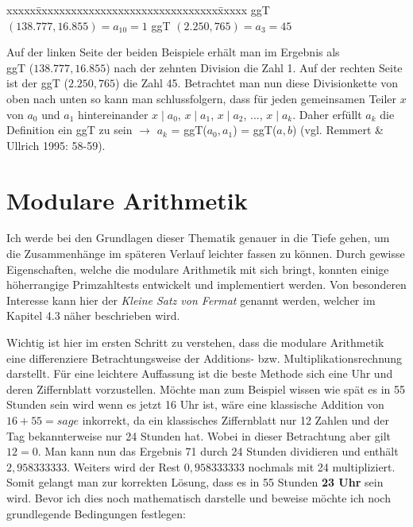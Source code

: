 \documentclass[german,12pt,a4paper]{article}
\begin{document}
\begin{tabbing}
xxxxx\=xxxxxxxxxxxxxxxxxxxxxxxxxxxxxxx\=xxxxx\kill
\> ggT $(138.777, 16.855) = a_{10} = 1$ \> ggT $(2.250, 765) = a_3 = 45$
\end{tabbing}

Auf der linken Seite der beiden Beispiele erhält man im Ergebnis als\\
ggT ($138.777, 16.855$) nach der zehnten Division die Zahl 1. Auf der rechten Seite ist der ggT ($2.250, 765$) die Zahl 45.
Betrachtet man nun diese Divisionkette von oben nach unten so kann man schlussfolgern, dass für jeden gemeinsamen Teiler $x$ von $a_0$ und $a_1$ hintereinander $x \mid a_0$, $x \mid a_1$, $x \mid a_2$, ..., $x \mid a_k$. Daher erfüllt $a_k$ die Definition ein ggT zu sein $\to$ $a_k$ = ggT($a_0,a_1$) = ggT($a, b$) (vgl. Remmert \& Ullrich 1995: 58-59).

\section{Modulare Arithmetik}
Ich werde bei den Grundlagen dieser Thematik genauer in die Tiefe gehen, um die Zusammenhänge im späteren Verlauf leichter fassen zu können. Durch gewisse Eigenschaften, welche die modulare Arithmetik mit sich bringt, konnten einige höherrangige Primzahltests entwickelt und implementiert werden. Von besonderen Interesse kann hier der \textit{Kleine Satz von Fermat} genannt werden, welcher im Kapitel 4.3 näher beschrieben wird.

Wichtig ist hier im ersten Schritt zu verstehen, dass die modulare Arithmetik eine differenziere Betrachtungsweise der Additions- bzw. Multiplikationsrechnung darstellt. Für eine leichtere Auffassung ist die beste Methode sich eine Uhr und deren Ziffernblatt vorzustellen. Möchte man zum Beispiel wissen wie spät es in 55 Stunden sein wird wenn es jetzt 16 Uhr ist, wäre eine klassische Addition von $16+55=sage$ 
inkorrekt, da ein klassisches Ziffernblatt nur 12 Zahlen und der Tag bekannterweise nur 24 Stunden hat. Wobei in dieser Betrachtung aber gilt $12=0$. Man kann nun das Ergebnis 71 durch 24 Stunden dividieren und enthält $2,958333333$. Weiters wird der Rest $0,958333333$ nochmals mit 24 multipliziert. Somit gelangt man zur korrekten Lösung, dass es in 55 Stunden \textbf{23 Uhr} sein wird.
Bevor ich dies noch mathematisch darstelle und beweise möchte ich noch grundlegende Bedingungen festlegen:
\end{document}
